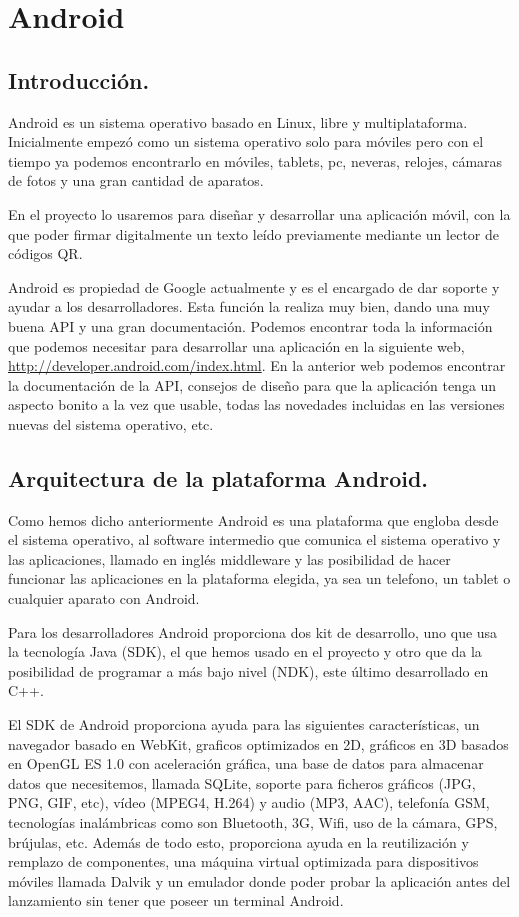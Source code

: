 \chapter{Android}\label{cap:android}


\section{Introducción.}

Android es un sistema operativo basado en Linux, libre y multiplataforma. Inicialmente empezó como un sistema operativo solo para móviles pero con el tiempo ya podemos encontrarlo en móviles, tablets, pc, neveras, relojes, cámaras de fotos y una gran cantidad de aparatos.

En el proyecto lo usaremos para diseñar y desarrollar una aplicación móvil, con la que poder firmar digitalmente un texto leído previamente mediante un lector de códigos QR.

Android es propiedad de Google actualmente y es el encargado de dar soporte y ayudar a los desarrolladores. Esta función la realiza muy bien, dando una muy buena API y una gran documentación. Podemos encontrar toda la información que podemos necesitar para desarrollar una aplicación en la siguiente web, \url{http://developer.android.com/index.html}. En la anterior web podemos encontrar la documentación de la API, consejos de diseño para que la aplicación tenga un aspecto bonito a la vez que usable, todas las novedades incluidas en las versiones nuevas del sistema operativo, etc.

\section{Arquitectura de la plataforma Android.}

Como hemos dicho anteriormente Android es una plataforma que engloba desde el sistema operativo, al software intermedio que comunica el sistema operativo y las aplicaciones, llamado en inglés middleware y las posibilidad de hacer funcionar las aplicaciones en la plataforma elegida, ya sea un telefono, un tablet o cualquier aparato con Android.

Para los desarrolladores Android proporciona dos kit de desarrollo, uno que usa la tecnología Java (SDK), el que hemos usado en el proyecto y otro que da la posibilidad de programar a más bajo nivel (NDK), este último desarrollado en C++.

El SDK de Android proporciona ayuda para las siguientes características, un navegador basado en WebKit, graficos optimizados en 2D, gráficos en 3D basados en OpenGL ES 1.0 con aceleración gráfica, una base de datos para almacenar datos que necesitemos, llamada SQLite, soporte para ficheros gráficos (JPG, PNG, GIF, etc), vídeo (MPEG4, H.264) y audio (MP3, AAC), telefonía GSM, tecnologías inalámbricas como son Bluetooth, 3G, Wifi, uso de la cámara, GPS, brújulas, etc. Además de todo esto, proporciona ayuda en la reutilización y remplazo de componentes, una máquina virtual optimizada para dispositivos móviles llamada Dalvik y un emulador donde poder probar la aplicación antes del lanzamiento sin tener que poseer un terminal Android. 


